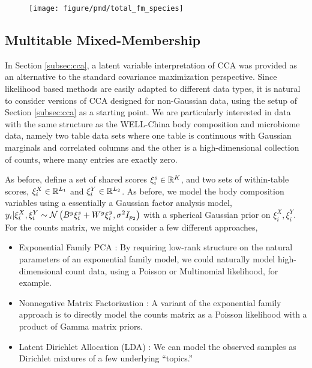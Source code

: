 \documentclass[14pt]{extarticle}
\begin{document}
\begin{figure}
  \centering
  \texttt{[image: figure/pmd/total\_fm\_species]}
  \caption{\label{fig:pmd_total_fm_species}}
\end{figure}

\subsection{Multitable Mixed-Membership}
\label{subsec:multitable_mixed_membership}

In Section \ref{subsec:cca}, a latent variable interpretation of CCA was
provided as an alternative to the standard covariance maximization perspective.
Since likelihood based methods are easily adapted to different data types, it is
natural to consider versions of CCA designed for non-Gaussian data, using the
setup of Section \ref{subsec:cca} as a starting point. We are particularly
interested in data with the same structure as the WELL-China body composition
and microbiome data, namely two table data sets where one table is continuous
with Gaussian marginals and correlated columns and the other is a
high-dimensional collection of counts, where many entries are exactly zero.

As before, define a set of shared scores $\xi_{i}^{s} \in \mathbb{R}^{K}$, and two
sets of within-table scores, $\xi_{i}^{X} \in \mathbb{R}^{L_{1}}$ and $\xi_{i}^{Y}
\in \mathbb{R}^{L_{2}}$. As before, we model the body composition variables using a
essentially a Gaussian factor analysis model, $y_{i} \vert \xi_{i}^{X},
\xi_{i}^{Y} \sim \mathcal{N}\left(B^{y}\xi_{i}^s + W^y \xi_{i}^y,
\sigma^{2}I_{p_{2}}\right)$ with a spherical Gaussian prior on $\xi_{i}^{X},
\xi_{i}^{Y}$. For the counts matrix, we might consider a few different
approaches,

\begin{itemize}
\item Exponential Family PCA \citep{mohamed2009bayesian}: By requiring low-rank
  structure on the natural parameters of an exponential family model, we could
  naturally model high-dimensional count data, using a Poisson or Multinomial
  likelihood, for example.
\item Nonnegative Matrix Factorization \citep{lee2001algorithms}: A variant of
  the exponential family approach is to directly model the counts matrix as a
  Poisson likelihood with a product of Gamma matrix priors.
\item Latent Dirichlet Allocation (LDA) \citep{blei2003latent}: We can model the
  observed samples as Dirichlet mixtures of a few underlying ``topics.''
\end{itemize}
\end{document}
